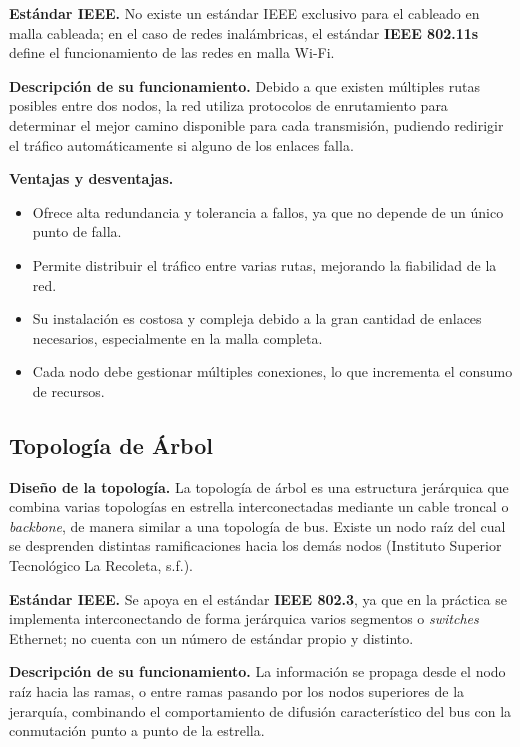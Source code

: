\documentclass[12pt,letterpaper]{article}
\begin{document}
\textbf{Estándar IEEE.} No existe un estándar IEEE exclusivo para el cableado en malla cableada; en el caso de redes inalámbricas, el estándar \textbf{IEEE 802.11s} define el funcionamiento de las redes en malla Wi-Fi.

\textbf{Descripción de su funcionamiento.} Debido a que existen múltiples rutas posibles entre dos nodos, la red utiliza protocolos de enrutamiento para determinar el mejor camino disponible para cada transmisión, pudiendo redirigir el tráfico automáticamente si alguno de los enlaces falla.

\textbf{Ventajas y desventajas.}
\begin{itemize}[nosep]
    \item[+] Ofrece alta redundancia y tolerancia a fallos, ya que no depende de un único punto de falla.
    \item[+] Permite distribuir el tráfico entre varias rutas, mejorando la fiabilidad de la red.
    \item[$-$] Su instalación es costosa y compleja debido a la gran cantidad de enlaces necesarios, especialmente en la malla completa.
    \item[$-$] Cada nodo debe gestionar múltiples conexiones, lo que incrementa el consumo de recursos.
\end{itemize}

\subsection{Topología de Árbol}

\textbf{Diseño de la topología.} La topología de árbol es una estructura jerárquica que combina varias topologías en estrella interconectadas mediante un cable troncal o \textit{backbone}, de manera similar a una topología de bus. Existe un nodo raíz del cual se desprenden distintas ramificaciones hacia los demás nodos (Instituto Superior Tecnológico La Recoleta, s.f.).

\textbf{Estándar IEEE.} Se apoya en el estándar \textbf{IEEE 802.3}, ya que en la práctica se implementa interconectando de forma jerárquica varios segmentos o \textit{switches} Ethernet; no cuenta con un número de estándar propio y distinto.

\textbf{Descripción de su funcionamiento.} La información se propaga desde el nodo raíz hacia las ramas, o entre ramas pasando por los nodos superiores de la jerarquía, combinando el comportamiento de difusión característico del bus con la conmutación punto a punto de la estrella.
\end{document}

